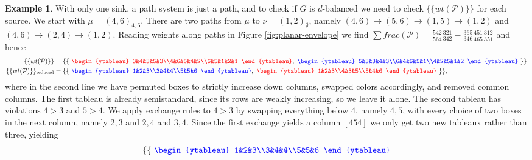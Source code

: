 \documentclass[11pt,letterpaper]{amsart}
\theoremstyle{definition}
\newtheorem{example}{Example}
\begin{document}
\begin{example}
With only one sink, a path system is just a path, and to check if $G$ is $d$-balanced we need to check $\{\{ wt(\mathcal{P}) \}\}$ for each source. We start with $\mu = (4,6)_{4,6}$. There are two paths from $\mu$ to $\nu = (1,2)_\emptyset$, namely $(4,6)\to(5,6)\to(1,5)\to(1,2)$ and $(4,6)\to(2,4)\to(1,2)$. Reading weights along paths in Figure \ref{fig:planar-envelope} we find $\sum frac(\mathcal{P}) = \frac{542}{564} \frac{321}{342} - \frac{365}{346} \frac{451}{465} \frac{312}{351}$ and hence
\begin{align*}
    \{\{ wt(\mathcal{P}) \}\} &= \{\{ \,\, \color{red} \begin{ytableau}
        3&4&3&5&3\\4&6&5&4&2\\6&5&1&2&1
    \end{ytableau}\color{black}, \,\, \color{blue} \begin{ytableau}
        5&3&3&4&3\\6&4&6&5&1\\4&2&5&1&2
    \end{ytableau} \,\, \color{black} \}\}\\
    \{\{ wt(\mathcal{P}) \}\}_{\text{reduced}} &= \{\{ \,\, \color{blue} \begin{ytableau}
        1&2&3\\3&4&4\\5&5&6
    \end{ytableau}\color{black}, \,\, \color{red}\begin{ytableau}
        1&2&3\\4&3&5\\5&4&6
    \end{ytableau} \color{black} \,\, \}\},
\end{align*}
where in the second line we have permuted boxes to strictly increase down columns, swapped colors accordingly, and removed common columns. The first tableau is already semistandard, since its rows are weakly increasing, so we leave it alone. The second tableau has violations $4>3$ and $5>4$. We apply exchange rules to $4>3$ by swapping everything below $4$, namely $4,5$, with every choice of two boxes in the next column, namely $2,3$ and $2,4$ and $3,4$. Since the first exchange yields a column $[454]$ we only get two new tableaux rather than three, yielding
\begin{align*}
    \{\{ \,\, \color{blue} \begin{ytableau}
        1&2&3\\3&4&4\\5&5&6

\end{ytableau}
\end{align*}
\end{example}
\end{document}
